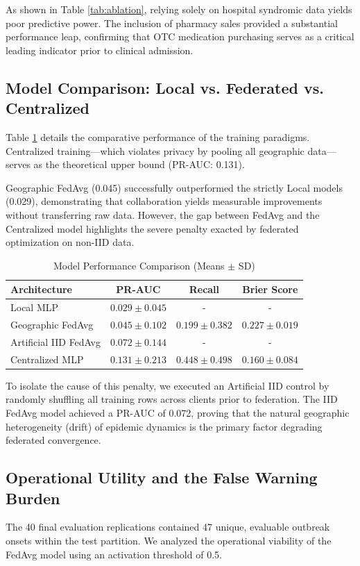 \documentclass[conference]{IEEEtran}
\begin{document}
As shown in Table \ref{tab:ablation}, relying solely on hospital syndromic data yields poor predictive power. The inclusion of pharmacy sales provided a substantial performance leap, confirming that OTC medication purchasing serves as a critical leading indicator prior to clinical admission.

\subsection{Model Comparison: Local vs. Federated vs. Centralized}
Table \ref{tab:comparison} details the comparative performance of the training paradigms. Centralized training—which violates privacy by pooling all geographic data—serves as the theoretical upper bound (PR-AUC: 0.131).

Geographic FedAvg (0.045) successfully outperformed the strictly Local models (0.029), demonstrating that collaboration yields measurable improvements without transferring raw data. However, the gap between FedAvg and the Centralized model highlights the severe penalty exacted by federated optimization on non-IID data. 

\begin{table}[h]
\centering
\caption{Model Performance Comparison (Means $\pm$ SD)}
\label{tab:comparison}
\begin{tabular}{@{}lccc@{}}
\toprule
\textbf{Architecture} & \textbf{PR-AUC} & \textbf{Recall} & \textbf{Brier Score} \\ \midrule
Local MLP & $0.029 \pm 0.045$ & - & - \\
Geographic FedAvg & $0.045 \pm 0.102$ & $0.199 \pm 0.382$ & $0.227 \pm 0.019$ \\
Artificial IID FedAvg & $0.072 \pm 0.144$ & - & - \\
Centralized MLP & $\mathbf{0.131 \pm 0.213}$ & $\mathbf{0.448 \pm 0.498}$ & $\mathbf{0.160 \pm 0.084}$ \\ \bottomrule
\end{tabular}
\end{table}

To isolate the cause of this penalty, we executed an Artificial IID control by randomly shuffling all training rows across clients prior to federation. The IID FedAvg model achieved a PR-AUC of 0.072, proving that the natural geographic heterogeneity (drift) of epidemic dynamics is the primary factor degrading federated convergence.

\subsection{Operational Utility and the False Warning Burden}
The 40 final evaluation replications contained 47 unique, evaluable outbreak onsets within the test partition. We analyzed the operational viability of the FedAvg model using an activation threshold of 0.5.
\end{document}
